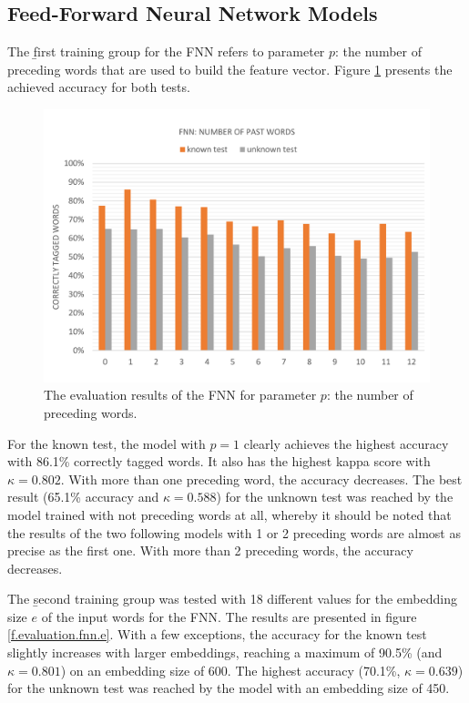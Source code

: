 \subsection{Feed-Forward Neural Network Models}\label{c.evaluation.results.fnn}
The \b{first training group} for the FNN refers to parameter $p$: the number of preceding words that are used to build the feature vector. Figure \ref{f.evaluation.fnn.p} presents the achieved accuracy for both tests.

\begin{figure}[H]
	\hspace{-5mm}\includegraphics[width=1.07\textwidth]{images/evaluation_fnn_p}
	\caption[FNN Evaluation: Number of Past Words]{The evaluation results of the FNN for parameter $p$: the number of preceding words.}
	\label{f.evaluation.fnn.p}
\end{figure}

For the known test, the model with $p=1$ clearly achieves the highest accuracy with 86.1\% correctly tagged words. It also has the highest kappa score with $\kappa=0.802$. With more than one preceding word, the accuracy decreases. The best result (65.1\% accuracy and $\kappa=0.588$) for the unknown test was reached by the model trained with not preceding words at all, whereby it should be noted that the results of the two following models with 1 or 2 preceding words are almost as precise as the first one. With more than 2 preceding words, the accuracy decreases.

The \b{second training group} was tested with 18 different values for the embedding size $e$ of the input words for the FNN. The results are presented in figure \ref{f.evaluation.fnn.e}. With a few exceptions, the accuracy for the known test slightly increases with larger embeddings, reaching a maximum of 90.5\% (and $\kappa=0.801$) on an embedding size of 600. The highest accuracy (70.1\%, $\kappa=0.639$) for the unknown test was reached by the model with an embedding size of 450.

